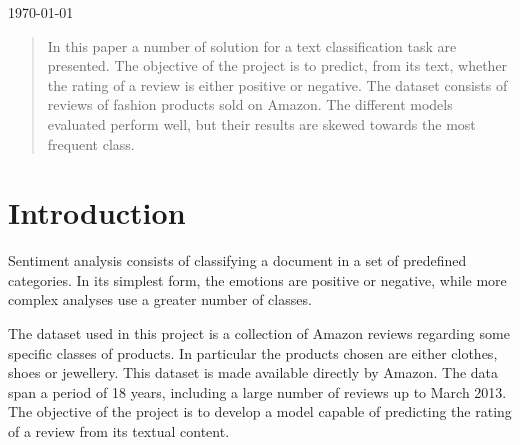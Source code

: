 \begin{titlepage}
{\large \today}\\[1cm] %

\begin{center}
\begin{Figure}
\end{Figure}
\end{center}
 

\vfill %

\end{titlepage}


\begin{abstract}
In this paper a number of solution for a text classification task are presented. The objective of the project is to predict, from its text, whether the rating of a review is either positive or negative. The dataset consists of reviews of fashion products sold on Amazon. The different models evaluated perform well, but their results are skewed towards the most frequent class. 
\end{abstract}

\section{Introduction}
Sentiment analysis consists of classifying a document in a set of predefined categories. In its simplest form, the emotions are positive or negative, while more complex analyses use a greater number of classes.

The dataset used in this project is a collection of Amazon reviews regarding some specific classes of products. In particular the products chosen are either clothes, shoes or jewellery. This dataset is made available directly by Amazon. The data span a period of 18 years, including a large number of reviews up to March 2013. The objective of the project is to develop a model capable of predicting the rating of a review from its textual content.

